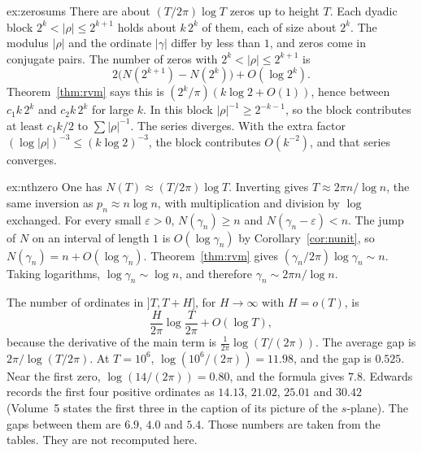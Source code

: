 \begin{solution}{ex:zerosums}
\idea There are about $(T/2\pi)\log T$ zeros up to height $T$. Each dyadic block $2^k<|\rho|\le2^{k+1}$ holds about $k\,2^k$ of them, each of size about $2^k$.
\writeup The modulus $|\rho|$ and the ordinate $|\gamma|$ differ by less than $1$, and zeros come in conjugate pairs. The number of zeros with $2^k<|\rho|\le2^{k+1}$ is
\[
2\bigl(N(2^{k+1})-N(2^k)\bigr)+O(\log2^k).
\]
Theorem~\ref{thm:rvm} says this is $(2^k/\pi)(k\log2+O(1))$, hence between $c_1k\,2^k$ and $c_2k\,2^k$ for large $k$. In this block $|\rho|^{-1}\ge2^{-k-1}$, so the block contributes at least $c_1k/2$ to $\sum|\rho|^{-1}$. The series diverges. With the extra factor $(\log|\rho|)^{-3}\le(k\log2)^{-3}$, the block contributes $O(k^{-2})$, and that series converges.
\end{solution}

\begin{solution}{ex:nthzero}
\idea One has $N(T)\approx(T/2\pi)\log T$. Inverting gives $T\approx2\pi n/\log n$, the same inversion as $p_n\approx n\log n$, with multiplication and division by $\log$ exchanged.
\writeup For every small $\varepsilon>0$, $N(\gamma_n)\ge n$ and $N(\gamma_n-\varepsilon)<n$. The jump of $N$ on an interval of length $1$ is $O(\log\gamma_n)$ by Corollary~\ref{cor:nunit}, so $N(\gamma_n)=n+O(\log\gamma_n)$. Theorem~\ref{thm:rvm} gives $(\gamma_n/2\pi)\log\gamma_n\sim n$. Taking logarithms, $\log\gamma_n\sim\log n$, and therefore $\gamma_n\sim2\pi n/\log n$.

The number of ordinates in $]T,T+H]$, for $H\to\infty$ with $H=o(T)$, is
\[
\frac H{2\pi}\log\frac T{2\pi}+O(\log T),
\]
because the derivative of the main term is $\frac1{2\pi}\log(T/(2\pi))$. The average gap is $2\pi/\log(T/2\pi)$. At $T=10^6$, $\log(10^6/(2\pi))=11.98$, and the gap is $0.525$. Near the first zero, $\log(14/(2\pi))=0.80$, and the formula gives $7.8$. Edwards records the first four positive ordinates as $14.13$, $21.02$, $25.01$ and $30.42$ (Volume~5 states the first three in the caption of its picture of the $s$-plane). The gaps between them are $6.9$, $4.0$ and $5.4$. Those numbers are taken from the tables. They are not recomputed here.
\end{solution}

